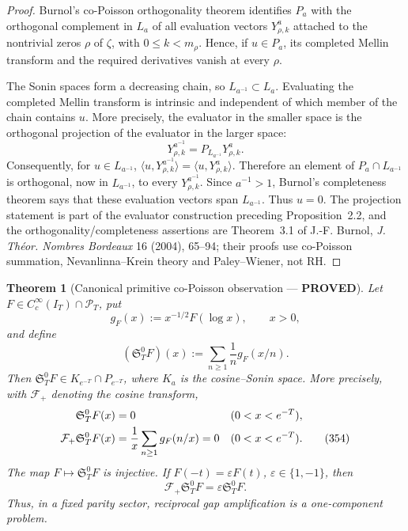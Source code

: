 \documentclass[11pt]{article}
\newtheorem{theorem}{Theorem}
\newcommand{\PROVED}{\textcolor{green!45!black}{\textbf{PROVED}}}
\begin{document}
\begin{proof}
Burnol's co-Poisson orthogonality theorem identifies $P_a$ with the
orthogonal complement in $L_a$ of all evaluation vectors
$Y^a_{\rho,k}$ attached to the nontrivial zeros $\rho$ of $\zeta$, with
$0\le k<m_\rho$.  Hence, if $u\in P_a$, its completed Mellin transform and
the required derivatives vanish at every $\rho$.

The Sonin spaces form a decreasing chain, so
$L_{a^{-1}}\subset L_a$.  Evaluating the completed Mellin transform is
intrinsic and independent of which member of the chain contains $u$.
More precisely, the evaluator in the smaller space is the orthogonal
projection of the evaluator in the larger space:
\[
 Y^{a^{-1}}_{\rho,k}
 =P_{L_{a^{-1}}}Y^a_{\rho,k}.
\]
Consequently, for $u\in L_{a^{-1}}$,
$\langle u,Y^{a^{-1}}_{\rho,k}\rangle
=\langle u,Y^a_{\rho,k}\rangle$.  Therefore an element of
$P_a\cap L_{a^{-1}}$ is orthogonal, now in $L_{a^{-1}}$, to every
$Y^{a^{-1}}_{\rho,k}$.  Since $a^{-1}>1$, Burnol's
completeness theorem says that these evaluation vectors span
$L_{a^{-1}}$.  Thus $u=0$.  The projection statement is part of the
evaluator construction preceding Proposition~2.2, and the
orthogonality/completeness assertions are Theorem~3.1 of J.-F. Burnol,
\emph{J. Th\'eor. Nombres Bordeaux} 16 (2004), 65--94;
their proofs use co-Poisson summation, Nevanlinna--Krein theory and
Paley--Wiener, not RH.
\end{proof}

\begin{theorem}[Canonical primitive co-Poisson observation --- \PROVED]
Let $F\in C_c^\infty(I_T)\cap\mathcal P_T$, put
\begin{equation}
 g_F(x):=x^{-1/2}F(\log x),\qquad x>0,                \tag{352}
\end{equation}
and define
\begin{equation}
 (\mathfrak S_T^0F)(x)
 :=\sum_{n\ge1}\frac1n g_F(x/n).                    \tag{353}
\end{equation}
Then $\mathfrak S_T^0F\in K_{e^{-T}}\cap P_{e^{-T}}$, where $K_a$
is the cosine--Sonin space.  More precisely, with $\mathcal F_+$ denoting
the cosine transform,
\begin{align}
 \mathfrak S_T^0F(x)&=0 &&(0<x<e^{-T}),\notag\\
 \mathcal F_+\mathfrak S_T^0F(x)
 &=\frac1x\sum_{n\ge1}g_F(n/x)=0 &&(0<x<e^{-T}).      \tag{354}
\end{align}
The map $F\mapsto\mathfrak S_T^0F$ is injective.  If
$F(-t)=\varepsilon F(t)$, $\varepsilon\in\{1,-1\}$, then
\begin{equation}
 \mathcal F_+\mathfrak S_T^0F
 =\varepsilon\mathfrak S_T^0F.                       \tag{355}
\end{equation}
Thus, in a fixed parity sector, reciprocal gap amplification is a
one-component problem.
\end{theorem}
\end{document}
